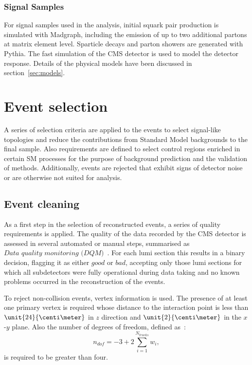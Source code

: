 \subsubsection{Signal Samples}
For signal samples used in the analysis, initial squark pair production is simulated with Madgraph, including the emission of up to two additional partons at matrix element level. Sparticle decays and parton showers are generated with Pythia. The fast simulation of the CMS detector is used to model the detector response. Details of the physical models have been discussed in section~\ref{sec:models}.
\section{Event selection}
A series of selection criteria are applied to the events to select signal-like topologies and reduce the contributions from Standard Model backgrounds to the final sample. Also requirements are defined to select control regions enriched in certain SM processes for the purpose of background prediction and the validation of methods. Additionally, events are rejected that exhibit signs of detector noise or are otherwise not suited for analysis. 

\subsection{Event cleaning}
As a first step in the selection of reconstructed events, a series of quality requirements is applied. 
The quality of the data recorded by the CMS detector is assessed in several automated or manual steps, summarised as $\textit{Data quality monitoring (DQM)}$~\cite{DQM}. For each lumi section this results in a binary decision, flagging it as either $\textit{good}$ or $\textit{bad}$, accepting only those lumi sections for which all subdetectors were fully operational during data taking and no known problems occurred in the reconstruction of the events.

To reject non-collision events, vertex information is used. The presence of at least one primary vertex is required whose distance to the interaction point is less than $\unit{24}{\centi\meter}$ in $z$ direction and $\unit{2}{\centi\meter}$ in the $x$-$y$ plane. Also the number of degrees of freedom, defined as~\cite{Chatrchyan:2014fea}:
\begin{equation}
n_{dof} = -3 + 2 \sum\limits_{i=1}^{N_{tracks}} w_i,
\end{equation}
is required to be greater than four.  

